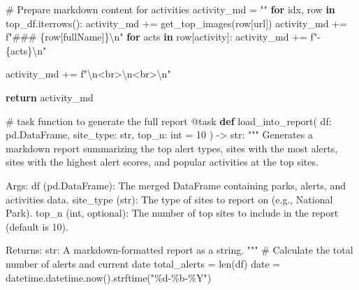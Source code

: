 \documentclass[
  letterpaper,
  DIV=11,
  numbers=noendperiod]{scrartcl}
\newenvironment{Shaded}{\begin{snugshade}}{\end{snugshade}}
\newcommand{\AttributeTok}[1]{\textcolor[rgb]{0.40,0.45,0.13}{#1}}
\newcommand{\BuiltInTok}[1]{\textcolor[rgb]{0.00,0.23,0.31}{#1}}
\newcommand{\CharTok}[1]{\textcolor[rgb]{0.13,0.47,0.30}{#1}}
\newcommand{\CommentTok}[1]{\textcolor[rgb]{0.37,0.37,0.37}{#1}}
\newcommand{\ControlFlowTok}[1]{\textcolor[rgb]{0.00,0.23,0.31}{\textbf{#1}}}
\newcommand{\DecValTok}[1]{\textcolor[rgb]{0.68,0.00,0.00}{#1}}
\newcommand{\KeywordTok}[1]{\textcolor[rgb]{0.00,0.23,0.31}{\textbf{#1}}}
\newcommand{\NormalTok}[1]{\textcolor[rgb]{0.00,0.23,0.31}{#1}}
\newcommand{\OperatorTok}[1]{\textcolor[rgb]{0.37,0.37,0.37}{#1}}
\newcommand{\SpecialCharTok}[1]{\textcolor[rgb]{0.37,0.37,0.37}{#1}}
\newcommand{\SpecialStringTok}[1]{\textcolor[rgb]{0.13,0.47,0.30}{#1}}
\newcommand{\StringTok}[1]{\textcolor[rgb]{0.13,0.47,0.30}{#1}}
\begin{document}
\begin{Shaded}
\begin{Highlighting}[]
    \CommentTok{\# Prepare markdown content for activities}
\NormalTok{    activity\_md }\OperatorTok{=} \StringTok{""}
    \ControlFlowTok{for}\NormalTok{ idx, row }\KeywordTok{in}\NormalTok{ top\_df.iterrows():}
\NormalTok{        activity\_md }\OperatorTok{+=}\NormalTok{ get\_top\_images(row[}\StringTok{\textquotesingle{}url\textquotesingle{}}\NormalTok{])}
\NormalTok{        activity\_md }\OperatorTok{+=} \SpecialStringTok{f"\#\#\# }\SpecialCharTok{\{}\NormalTok{row[}\StringTok{\textquotesingle{}fullName\textquotesingle{}}\NormalTok{]}\SpecialCharTok{\}}\CharTok{\textbackslash{}n}\SpecialStringTok{"}
        \ControlFlowTok{for}\NormalTok{ acts }\KeywordTok{in}\NormalTok{ row[}\StringTok{\textquotesingle{}activity\textquotesingle{}}\NormalTok{]:}
\NormalTok{            activity\_md }\OperatorTok{+=} \SpecialStringTok{f"{-} }\SpecialCharTok{\{}\NormalTok{acts}\SpecialCharTok{\}}\CharTok{\textbackslash{}n}\SpecialStringTok{"}

\NormalTok{        activity\_md }\OperatorTok{+=} \SpecialStringTok{f"}\CharTok{\textbackslash{}n}\SpecialStringTok{\textless{}br\textgreater{}}\CharTok{\textbackslash{}n}\SpecialStringTok{\textless{}br\textgreater{}}\CharTok{\textbackslash{}n}\SpecialStringTok{"}

    \ControlFlowTok{return}\NormalTok{ activity\_md}

\CommentTok{\# task function to generate the full report}
\AttributeTok{@task}
\KeywordTok{def}\NormalTok{ load\_into\_report(}
\NormalTok{        df: pd.DataFrame,}
\NormalTok{        site\_type: }\BuiltInTok{str}\NormalTok{,}
\NormalTok{        top\_n: }\BuiltInTok{int} \OperatorTok{=} \DecValTok{10}
\NormalTok{    ) }\OperatorTok{{-}\textgreater{}} \BuiltInTok{str}\NormalTok{:}
    \CommentTok{"""}
\CommentTok{    Generates a markdown report summarizing the top alert types, sites with the most alerts,}
\CommentTok{    sites with the highest alert scores, and popular activities at the top sites.}

\CommentTok{    Args:}
\CommentTok{        df (pd.DataFrame): The merged DataFrame containing parks, alerts, and activities data.}
\CommentTok{        site\_type (str): The type of sites to report on (e.g., \textquotesingle{}National Park\textquotesingle{}).}
\CommentTok{        top\_n (int, optional): The number of top sites to include in the report (default is 10).}

\CommentTok{    Returns:}
\CommentTok{        str: A markdown{-}formatted report as a string.}
\CommentTok{    """}
    \CommentTok{\# Calculate the total number of alerts and current date}
\NormalTok{    total\_alerts }\OperatorTok{=} \BuiltInTok{len}\NormalTok{(df)}
\NormalTok{    date }\OperatorTok{=}\NormalTok{ datetime.datetime.now().strftime(}\StringTok{"}\SpecialCharTok{\%d}\StringTok{{-}\%b{-}\%Y"}\NormalTok{)}


\end{Highlighting}
\end{Shaded}
\end{document}
